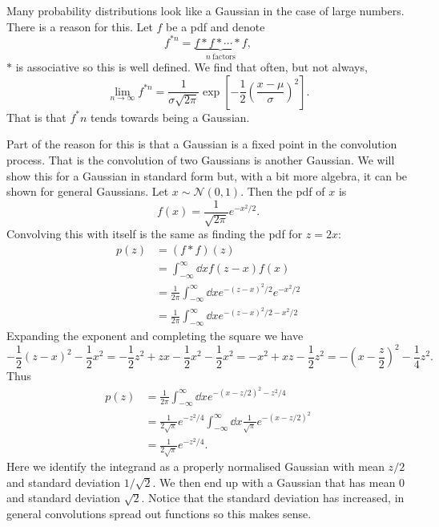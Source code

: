 \documentclass[a4paper]{article}
\newcommand{\convolution}{\mathbin{*}}
\newcommand{\distributed}{\sim}
\newcommand{\normal}{\mathcal{N}}
\begin{document}
    Many probability distributions look like a Gaussian in the case of large numbers.
    There is a reason for this.
    Let \(f\) be a \gls{pdf} and denote
    \[f^{{\convolution}n} = \underbrace{f \convolution f \convolution \dotsb \convolution f}_{n~\text{factors}},\]
    \(\convolution\) is associative so this is well defined.
    We find that often, but not always,
    \[\lim_{n\to\infty} f^{{\convolution}n} = \frac{1}{\sigma\sqrt{2\pi}}\exp\left[-\frac{1}{2}\left(\frac{x - \mu}{\sigma}\right)^2\right].\]
    That is that \(f^{\convolution}n\) tends towards being a Gaussian.
    
    Part of the reason for this is that a Gaussian is a fixed point in the convolution process.
    That is the convolution of two Gaussians is another Gaussian.
    We will show this for a Gaussian in standard form but, with a bit more algebra, it can be shown for general Gaussians.
    Let \(x\distributed \normal(0, 1)\).
    Then the \gls{pdf} of \(x\) is
    \[f(x) = \frac{1}{\sqrt{2\pi}}e^{-x^2/2}.\]
    Convolving this with itself is the same as finding the \gls{pdf} for \(z = 2x\):
    \begin{align*}
        p(z) &= (f\convolution f)(z)\\
        &= \int_{-\infty}^{\infty} \dd{x} f(z - x)f(x)\\
        &= \frac{1}{2\pi} \int_{-\infty}^{\infty} \dd{x} e^{-(z - x)^2/2} e^{-x^2/2}\\
        &= \frac{1}{2\pi} \int_{-\infty}^{\infty} \dd{x} e^{-(z - x)^2/2 - x^2/2}
    \end{align*}
    Expanding the exponent and completing the square we have
    \[-\frac{1}{2}(z - x)^2 - \frac{1}{2}x^2 = -\frac{1}{2}z^2 + zx - \frac{1}{2}x^2 - \frac{1}{2}x^2 = -x^2 + xz -\frac{1}{2}z^2 = -\left(x - \frac{z}{2}\right)^2 - \frac{1}{4}z^2.\]
    Thus
    \begin{align*}
        p(z) &= \frac{1}{2\pi} \int_{-\infty}^{\infty} \dd{x} e^{-(x - z/2)^2 - z^2/4}\\
        &= \frac{1}{2\sqrt{\pi}} e^{-z^2/4} \int_{-\infty}^{\infty} \dd{x} \frac{1}{\sqrt{\pi}} e^{-(x - z/2)^2}\\
        &= \frac{1}{2\sqrt{\pi}} e^{-z^2/4}.
    \end{align*}
    Here we identify the integrand as a properly normalised Gaussian with mean \(z/2\) and standard deviation \(1/\sqrt{2}\).
    We then end up with a Gaussian that has mean 0 and standard deviation \(\sqrt{2}\).
    Notice that the standard deviation has increased, in general convolutions spread out functions so this makes sense.
    
\end{document}
